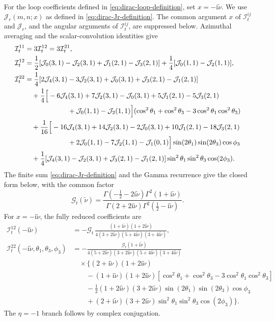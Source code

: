\documentclass[a4paper,12pt]{article}
\newcommand{\ii}{\mathrm i}
\newcommand{\tn}{\tilde\nu}
\begin{document}
For the loop coefficients defined in \eqref{eq:dirac-loop-definition},
set $x=-\ii\tn$.
We use $\mathcal J_r(m,n;x)$ as defined in
\eqref{eq:dirac-Jr-definition}. The common argument $x$ of
$\mathcal I^{ij}_{t}$ and $\mathcal J_r$, and the angular
arguments of $\mathcal I^{ij}_{t}$, are suppressed below.
Azimuthal averaging and the scalar-convolution identities give
\begin{align}
 \mathcal I^{11}_{t}
 &=3\mathcal I^{12}_{t}=3\mathcal I^{21}_{t},
 \nonumber\\
 \mathcal I^{12}_{t}
 &=\frac12[\mathcal J_0(3,1)-\mathcal J_2(3,1)
 +\mathcal J_1(2,1)-\mathcal J_3(2,1)]
 +\frac14[\mathcal J_0(1,1)-\mathcal J_2(1,1)],
 \nonumber\\
 \mathcal I^{22}_{t}
 &=\frac14[2\mathcal J_4(3,1)-3\mathcal J_2(3,1)+\mathcal J_0(3,1)
 +\mathcal J_3(2,1)-\mathcal J_1(2,1)]\nonumber\\
 &\quad+\frac14\Big[-6\mathcal J_4(3,1)+7\mathcal J_2(3,1)-\mathcal J_0(3,1)
 +5\mathcal J_1(2,1)-5\mathcal J_3(2,1)\nonumber\\
 &\hspace{22mm}+\mathcal J_0(1,1)-\mathcal J_2(1,1)\Big]
 (\cos^2\theta_1+\cos^2\theta_3-3\cos^2\theta_1\cos^2\theta_3)\nonumber\\
 &\quad+\frac1{16}\Big[-16\mathcal J_4(3,1)+14\mathcal J_2(3,1)-2\mathcal J_0(3,1)
 +10\mathcal J_1(2,1)-18\mathcal J_3(2,1)\nonumber\\
 &\hspace{22mm}+2\mathcal J_0(1,1)-7\mathcal J_2(1,1)-\mathcal J_1(0,1)\Big]
 \sin(2\theta_1)\sin(2\theta_3)\cos\phi_3\nonumber\\
 &\quad+\frac14[\mathcal J_4(3,1)-\mathcal J_2(3,1)
 +\mathcal J_3(2,1)-\mathcal J_1(2,1)]
 \sin^2\theta_1\sin^2\theta_3\cos(2\phi_3).
 \label{eq:dirac-loop-reduction}
\end{align}
The finite sum \eqref{eq:dirac-Jr-definition} and the Gamma recurrence
give the closed form below, with the common factor
\begin{equation}
 \mathcal G_{t}(\tn)
 =\frac{\Gamma(-\tfrac12-2\ii\tn)\Gamma^2(1+\ii\tn)}
 {\Gamma(2+2\ii\tn)
 \Gamma^2(\tfrac12-\ii\tn)}.
 \label{eq:dirac-loop-Gamma}
\end{equation}
For $x=-\ii\tn$, the fully reduced coefficients are
\begin{align}
 \mathcal I^{12}_{t}(-\ii\tn)
 &=-\mathcal G_{t}\,
 \frac{(1+\ii\tn)(1+2\ii\tn)}
 {4(3+2\ii\tn)(5+4\ii\tn)(3+4\ii\tn)},
 \nonumber\\
 \mathcal I^{22}_{t}(-\ii\tn,\theta_1,\theta_3,\phi_3)
 &=-\frac{\mathcal G_{t}(1+\ii\tn)}
 {4(5+2\ii\tn)(3+2\ii\tn)(5+4\ii\tn)(3+4\ii\tn)}
 \nonumber\\
 &\quad\times\Big\{(2+\ii\tn)(1+2\ii\tn)\nonumber\\
 &\qquad-(1+\ii\tn)(1+2\ii\tn)
 [\cos^2\theta_1+\cos^2\theta_3-3\cos^2\theta_1\cos^2\theta_3]\nonumber\\
 &\qquad-\frac12(1+2\ii\tn)(3+2\ii\tn)
 \sin(2\theta_1)\sin(2\theta_3)\cos\phi_3\nonumber\\
 &\qquad+(2+\ii\tn)(3+2\ii\tn)
 \sin^2\theta_1\sin^2\theta_3\cos(2\phi_3)\Big\}.
 \label{eq:dirac-loop-closed}
\end{align}
The $\eta=-1$ branch follows by complex conjugation.
\end{document}
